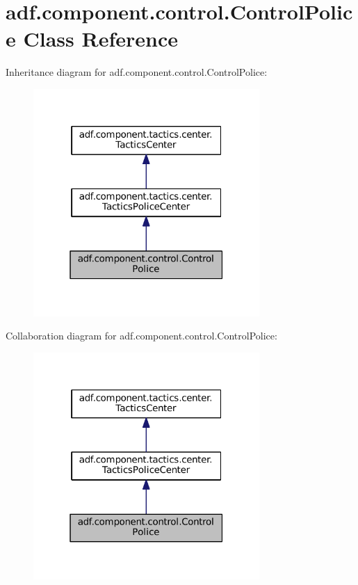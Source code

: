 \hypertarget{classadf_1_1component_1_1control_1_1ControlPolice}{}\section{adf.\+component.\+control.\+Control\+Police Class Reference}
\label{classadf_1_1component_1_1control_1_1ControlPolice}


Inheritance diagram for adf.\+component.\+control.\+Control\+Police\+:
\nopagebreak
\begin{figure}[H]
\begin{center}
\leavevmode
\includegraphics[width=244pt]{classadf_1_1component_1_1control_1_1ControlPolice__inherit__graph}
\end{center}
\end{figure}


Collaboration diagram for adf.\+component.\+control.\+Control\+Police\+:
\nopagebreak
\begin{figure}[H]
\begin{center}
\leavevmode
\includegraphics[width=244pt]{classadf_1_1component_1_1control_1_1ControlPolice__coll__graph}
\end{center}
\end{figure}
